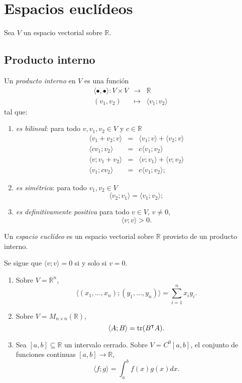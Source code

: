 \chapter{Espacios eucl\'ideos}

Sea $V$ un espacio vectorial sobre $\mathbb{R}$.

\section{Producto interno}

\begin{defn}
Un \emph{producto interno} en $V$ es una funci\'on
\begin{eqnarray*}
\langle\bullet,\bullet\rangle: V\times V & \longrightarrow & \mathbb{R}\\
(v_1,v_2) & \longmapsto & \langle v_1;v_2\rangle
\end{eqnarray*}
tal que:
\begin{enumerate}
\item \emph{es bilineal}: para todo $v,v_1,v_2\in V$ y $c\in\mathbb{R}$
\begin{eqnarray*}
\langle v_1+v_2;v\rangle & = & \langle v_1;v\rangle+\langle v_2;v\rangle\\
\langle cv_1;v_2\rangle & = & c\langle v_1;v_2\rangle\\
\langle v;v_1+v_2\rangle & = & \langle v;v_1\rangle + \langle v;v_2\rangle\\
\langle v_1;cv_2\rangle & = & c\langle v_1;v_2\rangle;
\end{eqnarray*}
\item \emph{es sim\'etrica}: para todo $v_1,v_2\in V$
\[
\langle v_2;v_1\rangle=\langle v_1;v_2\rangle;
\]
\item \emph{es definitivamente positiva} para todo $v\in V$, $v\ne 0$,
\[
\langle v;v\rangle>0.
\]
\end{enumerate}
Un \emph{espacio eucl\'ideo} es un espacio vectorial sobre $\mathbb{R}$ provisto de un producto interno. 
\end{defn}


\begin{obs}
Se sigue que $\langle v;v \rangle=0$ si y solo si $v=0$.
\end{obs}

\begin{ejem}
\begin{enumerate}
\item Sobre $V=\mathbb{R}^n$,
\[
\langle (x_1,\ldots,x_n);(y_1,\ldots,y_n)\rangle =\sum_{i=1}^n x_iy_i.
\]
\item Sobre $V=M_{n\times n}(\mathbb{R})$,
\[
\langle A; B\rangle=\operatorname{tr}(B^\intercal A).
\]
\item Sea $[a,b]\subseteq\mathbb{R}$ un intervalo cerrado. Sobre $V=C^0[a,b]$, el conjunto de funciones continuas $[a,b]\rightarrow\mathbb{R}$,
\[
\langle f;g \rangle=\int_a^bf(x)g(x)dx.
\]
\end{enumerate}
\end{ejem}

